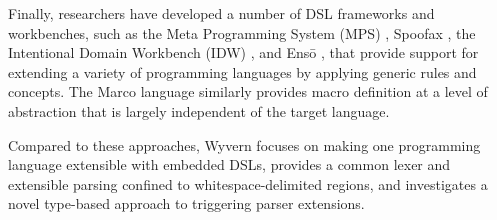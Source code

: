Finally, researchers have developed a number of DSL frameworks and workbenches, such as the Meta Programming System (MPS) \cite{mps}, Spoofax \cite{KatsVisser2010}, the Intentional Domain Workbench (IDW) \cite{idw}, and Ens\={o} \cite{enso}, that provide support for extending a variety of programming languages by applying generic rules and concepts.  The Marco language \cite{lee:2012:marco} similarly provides macro definition at a level of abstraction that is largely independent of the target language.

Compared to these approaches, Wyvern focuses on making one programming language extensible with embedded DSLs, provides a common lexer and extensible parsing confined to whitespace-delimited regions, and investigates a novel type-based approach to triggering parser extensions.



